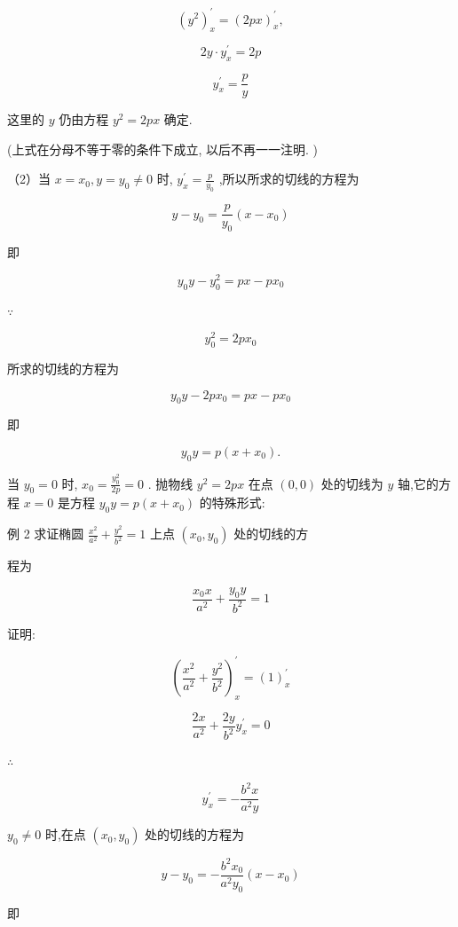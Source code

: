 \documentclass[10pt]{article}
\begin{document}
\[
{\left( {y}^{2}\right) }_{x}^{\prime } = {\left( 2px\right) }_{x}^{\prime },
\]

\[
{2y} \cdot {y}_{x}^{\prime } = {2p}
\]

\[
{y}_{x}^{\prime } = \frac{p}{y}
\]

这里的 \(y\) 仍由方程 \({y}^{2} = {2px}\) 确定.

(上式在分母不等于零的条件下成立, 以后不再一一注明. )

（2）当 \(x = {x}_{0},y = {y}_{0} \neq 0\) 时, \({y}_{x}^{\prime } = \frac{p}{{y}_{0}}\) ,所以所求的切线的方程为

\[
y - {y}_{0} = \frac{p}{{y}_{0}}\left( {x - {x}_{0}}\right)
\]

即

\[
{y}_{0}y - {y}_{0}^{2} = {px} - p{x}_{0}
\]

\(\because\)

\[
{y}_{0}^{2} = {2p}{x}_{0}
\]

所求的切线的方程为

\[
{y}_{0}y - {2p}{x}_{0} = {px} - p{x}_{0}
\]

即

\[
{y}_{0}y = p\left( {x + {x}_{0}}\right) .
\]

当 \({y}_{0} = 0\) 时, \({x}_{0} = \frac{{y}_{0}^{2}}{2p} = 0\) . 抛物线 \({y}^{2} = {2px}\) 在点 \(\left( {0,0}\right)\) 处的切线为 \(y\) 轴,它的方程 \(x = 0\) 是方程 \({y}_{0}y = p\left( {x + {x}_{0}}\right)\) 的特殊形式:

例 2 求证椭圆 \(\frac{{x}^{2}}{{a}^{2}} + \frac{{y}^{2}}{{b}^{2}} = 1\) 上点 \(\left( {{x}_{0},{y}_{0}}\right)\) 处的切线的方

程为

\[
\frac{{x}_{0}x}{{a}^{2}} + \frac{{y}_{0}y}{{b}^{2}} = 1
\]

证明:

\[
{\left( \frac{{x}^{2}}{{a}^{2}} + \frac{{y}^{2}}{{b}^{2}}\right) }_{x}^{\prime } = {\left( 1\right) }_{x}^{\prime }
\]

\[
\frac{2x}{{a}^{2}} + \frac{2y}{{b}^{2}}{y}_{x}^{\prime } = 0
\]

\(\therefore\)

\[
{y}_{x}^{\prime } = - \frac{{b}^{2}x}{{a}^{2}y}
\]

\({y}_{0} \neq 0\) 时,在点 \(\left( {{x}_{0},{y}_{0}}\right)\) 处的切线的方程为

\[
y - {y}_{0} = - \frac{{b}^{2}{x}_{0}}{{a}^{2}{y}_{0}}\left( {x - {x}_{0}}\right)
\]

即
\end{document}

